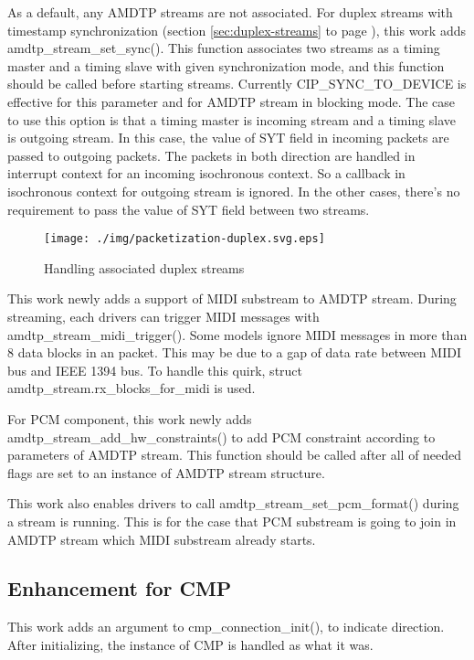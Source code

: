 \documentclass[onecolumn]{article}
\begin{document}
As a default, any AMDTP streams are not associated. For duplex streams with timestamp synchronization (section \ref{sec:duplex-streams} to page \pageref{sec:duplex-streams}), this work adds amdtp\_stream\_set\_sync(). This function associates two streams as a timing master and a timing slave with given synchronization mode, and this function should be called before starting streams. Currently CIP\_SYNC\_TO\_DEVICE is effective for this parameter and for AMDTP stream in blocking mode. The case to use this option is that a timing master is incoming stream and a timing slave is outgoing stream. In this case, the value of SYT field in incoming packets are passed to outgoing packets. The packets in both direction are handled in interrupt context for an incoming isochronous context. So a callback in isochronous context for outgoing stream is ignored. In the other cases, there's no requirement to pass the value of SYT field between two streams.

\begin{figure}[H]
	\centering
	\texttt{[image: ./img/packetization-duplex.svg.eps]}
	\caption{{Handling associated duplex streams}}
	\label{fig:packetization-duplex}
\end{figure}


This work newly adds a support of MIDI substream to AMDTP stream. During streaming, each drivers can trigger MIDI messages with amdtp\_stream\_midi\_trigger(). Some models ignore MIDI messages in more than 8 data blocks in an packet. This may be due to a gap of data rate between MIDI bus and IEEE 1394 bus. To handle this quirk, struct amdtp\_stream.rx\_blocks\_for\_midi is used.

For PCM component, this work newly adds amdtp\_stream\_add\_hw\_constraints() to add PCM constraint according to parameters of AMDTP stream. This function should be called after all of needed flags are set to an instance of AMDTP stream structure.

This work also enables drivers to call amdtp\_stream\_set\_pcm\_format() during a stream is running. This is for the case that PCM substream is going to join in AMDTP stream which MIDI substream already starts.

\subsection{Enhancement for CMP}

This work adds an argument to cmp\_connection\_init(), to indicate direction. After initializing, the instance of CMP is handled as what it was.
\end{document}
